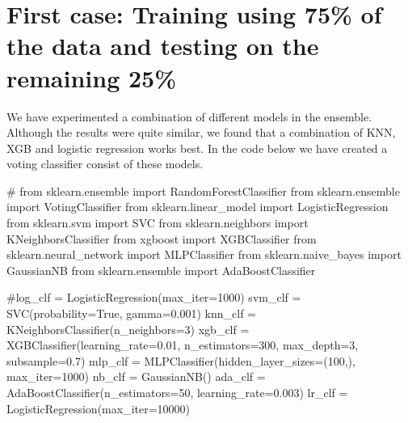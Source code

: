 \documentclass[
  letterpaper,
  DIV=11,
  numbers=noendperiod]{scrartcl}
\newenvironment{Shaded}{\begin{snugshade}}{\end{snugshade}}
\newcommand{\CommentTok}[1]{\textcolor[rgb]{0.37,0.37,0.37}{#1}}
\newcommand{\DecValTok}[1]{\textcolor[rgb]{0.68,0.00,0.00}{#1}}
\newcommand{\FloatTok}[1]{\textcolor[rgb]{0.68,0.00,0.00}{#1}}
\newcommand{\ImportTok}[1]{\textcolor[rgb]{0.00,0.46,0.62}{#1}}
\newcommand{\NormalTok}[1]{\textcolor[rgb]{0.00,0.23,0.31}{#1}}
\newcommand{\OperatorTok}[1]{\textcolor[rgb]{0.37,0.37,0.37}{#1}}
\newcommand{\VariableTok}[1]{\textcolor[rgb]{0.07,0.07,0.07}{#1}}
\begin{document}
\hypertarget{first-case-training-using-75-of-the-data-and-testing-on-the-remaining-25}{%
\section{First case: Training using 75\% of the data and testing on the
remaining
25\%}\label{first-case-training-using-75-of-the-data-and-testing-on-the-remaining-25}}

We have experimented a combination of different models in the ensemble.
Although the results were quite similar, we found that a combination of
KNN, XGB and logistic regression works best. In the code below we have
created a voting classifier consist of these models.

\begin{Shaded}
\begin{Highlighting}[]
\CommentTok{\# from sklearn.ensemble import RandomForestClassifier}
\ImportTok{from}\NormalTok{ sklearn.ensemble }\ImportTok{import}\NormalTok{ VotingClassifier}
\ImportTok{from}\NormalTok{ sklearn.linear\_model }\ImportTok{import}\NormalTok{ LogisticRegression}
\ImportTok{from}\NormalTok{ sklearn.svm }\ImportTok{import}\NormalTok{ SVC}
\ImportTok{from}\NormalTok{ sklearn.neighbors }\ImportTok{import}\NormalTok{ KNeighborsClassifier}
\ImportTok{from}\NormalTok{ xgboost }\ImportTok{import}\NormalTok{ XGBClassifier}
\ImportTok{from}\NormalTok{ sklearn.neural\_network }\ImportTok{import}\NormalTok{ MLPClassifier}
\ImportTok{from}\NormalTok{ sklearn.naive\_bayes }\ImportTok{import}\NormalTok{ GaussianNB}
\ImportTok{from}\NormalTok{ sklearn.ensemble }\ImportTok{import}\NormalTok{ AdaBoostClassifier}

\CommentTok{\#log\_clf = LogisticRegression(max\_iter=1000)}
\NormalTok{svm\_clf }\OperatorTok{=}\NormalTok{ SVC(probability}\OperatorTok{=}\VariableTok{True}\NormalTok{, gamma}\OperatorTok{=}\FloatTok{0.001}\NormalTok{)}
\NormalTok{knn\_clf }\OperatorTok{=}\NormalTok{ KNeighborsClassifier(n\_neighbors}\OperatorTok{=}\DecValTok{3}\NormalTok{)}
\NormalTok{xgb\_clf }\OperatorTok{=}\NormalTok{ XGBClassifier(learning\_rate}\OperatorTok{=}\FloatTok{0.01}\NormalTok{, n\_estimators}\OperatorTok{=}\DecValTok{300}\NormalTok{, max\_depth}\OperatorTok{=}\DecValTok{3}\NormalTok{, subsample}\OperatorTok{=}\FloatTok{0.7}\NormalTok{)}
\NormalTok{mlp\_clf }\OperatorTok{=}\NormalTok{ MLPClassifier(hidden\_layer\_sizes}\OperatorTok{=}\NormalTok{(}\DecValTok{100}\NormalTok{,), max\_iter}\OperatorTok{=}\DecValTok{1000}\NormalTok{)}
\NormalTok{nb\_clf }\OperatorTok{=}\NormalTok{ GaussianNB()}
\NormalTok{ada\_clf }\OperatorTok{=}\NormalTok{ AdaBoostClassifier(n\_estimators}\OperatorTok{=}\DecValTok{50}\NormalTok{, learning\_rate}\OperatorTok{=}\FloatTok{0.003}\NormalTok{)}
\NormalTok{lr\_clf }\OperatorTok{=}\NormalTok{ LogisticRegression(max\_iter}\OperatorTok{=}\DecValTok{10000}\NormalTok{)}


\end{Highlighting}
\end{Shaded}
\end{document}
